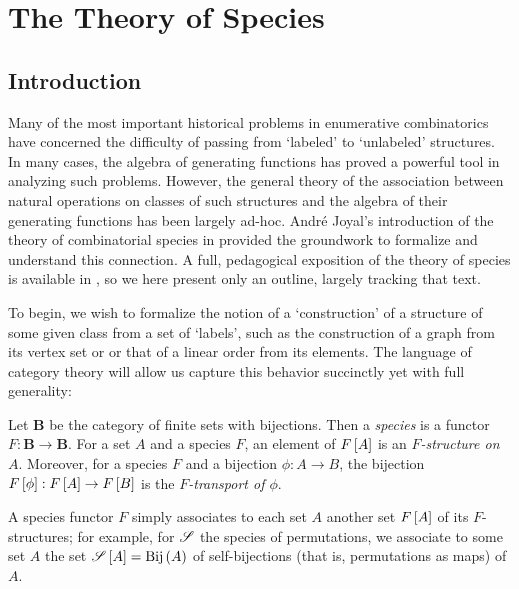 \documentclass[sectionflow,singlespace,twoside]{brandiss} %
\numberwithin{section}{chapter}
\numberwithin{figure}{chapter}
\begin{document}
\tableofcontents %

\listoffigures %

\listoftables %

\mainmatter

\chapter{The Theory of Species}\label{c:species}
\section{Introduction}\label{s:introspec}
Many of the most important historical problems in enumerative combinatorics have concerned the difficulty of passing from `labeled' to `unlabeled' structures.
In many cases, the algebra of generating functions has proved a powerful tool in analyzing such problems.
However, the general theory of the association between natural operations on classes of such structures and the algebra of their generating functions has been largely ad-hoc.
Andr\'{e} Joyal's introduction of the theory of combinatorial species in \cite{joy:species} provided the groundwork to formalize and understand this connection.
A full, pedagogical exposition of the theory of species is available in \cite{bll:species}, so we here present only an outline, largely tracking that text.

To begin, we wish to formalize the notion of a `construction' of a structure of some given class from a set of `labels', such as the construction of a graph from its vertex set or or that of a linear order from its elements.
The language of category theory will allow us capture this behavior succinctly yet with full generality:
\begin{definition}\label{def:species} %
  Let $\mathbf{B}$ be the category of finite sets with bijections.
  Then a \emph{species} is a functor $F: \mathbf{B} \to \mathbf{B}$.
  For a set $A$ and a species $F$, an element of $F \left[ {A} \right]$ is an \emph{$F$-structure on $A$}.
  Moreover, for a species $F$ and a bijection $\phi: A \to B$, the bijection $F \left[ {\phi} \right]: F \left[ {A} \right] \to F \left[ {B} \right]$ is the \emph{$F$-transport of $\phi$}.
\end{definition}
A species functor $F$ simply associates to each set $A$ another set $F \left[ {A} \right]$ of its $F$-structures; for example, for $\mathscr{S}$ the species of permutations, we associate to some set $A$ the set $\mathscr{S} \left[ {A} \right] = \operatorname{Bij} \left( {A} \right)$ of self-bijections (that is, permutations as maps) of $A$. 
\end{document}
